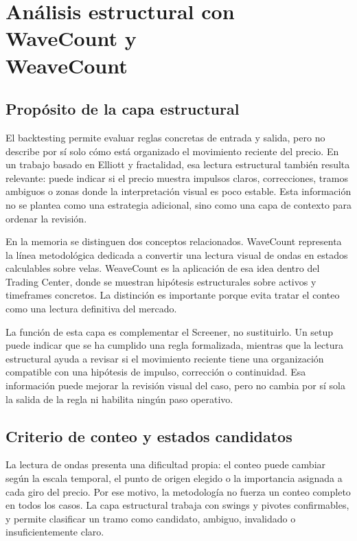\section[An\'alisis estructural con WaveCount y WeaveCount]{An\'alisis estructural con WaveCount y\\ WeaveCount}
\label{sec:wavecount-weavecount-metodologia}

\subsection{Prop\'osito de la capa estructural}
\label{subsec:proposito-capa-estructural}

El backtesting permite evaluar reglas concretas de entrada y salida, pero no
describe por s\'i solo c\'omo est\'a organizado el movimiento reciente del precio.
En un trabajo basado en Elliott y fractalidad, esa lectura estructural tambi\'en
resulta relevante: puede indicar si el precio muestra impulsos claros,
correcciones, tramos ambiguos o zonas donde la interpretaci\'on visual es poco
estable. Esta informaci\'on no se plantea como una estrategia adicional, sino
como una capa de contexto para ordenar la revisi\'on.

En la memoria se distinguen dos conceptos relacionados. WaveCount representa la
l\'inea metodol\'ogica dedicada a convertir una lectura visual de ondas en estados
calculables sobre velas. WeaveCount es la aplicaci\'on de esa idea dentro del
Trading Center, donde se muestran hip\'otesis estructurales sobre activos y
timeframes concretos. La distinci\'on es importante porque evita tratar
el conteo como una lectura definitiva del mercado.

La funci\'on de esta capa es complementar el Screener, no sustituirlo. Un setup
puede indicar que se ha cumplido una regla formalizada, mientras que la lectura
estructural ayuda a revisar si el movimiento reciente tiene una organizaci\'on
compatible con una hip\'otesis de impulso, correcci\'on o continuidad. Esa
informaci\'on puede mejorar la revisi\'on visual del caso, pero no cambia por s\'i
sola la salida de la regla ni habilita ning\'un paso operativo.

\subsection{Criterio de conteo y estados candidatos}
\label{subsec:criterio-conteo-estados}

La lectura de ondas presenta una dificultad propia: el conteo puede cambiar
seg\'un la escala temporal, el punto de origen elegido o la importancia asignada
a cada giro del precio. Por ese motivo, la metodolog\'ia no fuerza un conteo
completo en todos los casos. La capa estructural trabaja con swings y pivotes
confirmables, y permite clasificar un tramo como candidato, ambiguo, invalidado
o insuficientemente claro.

